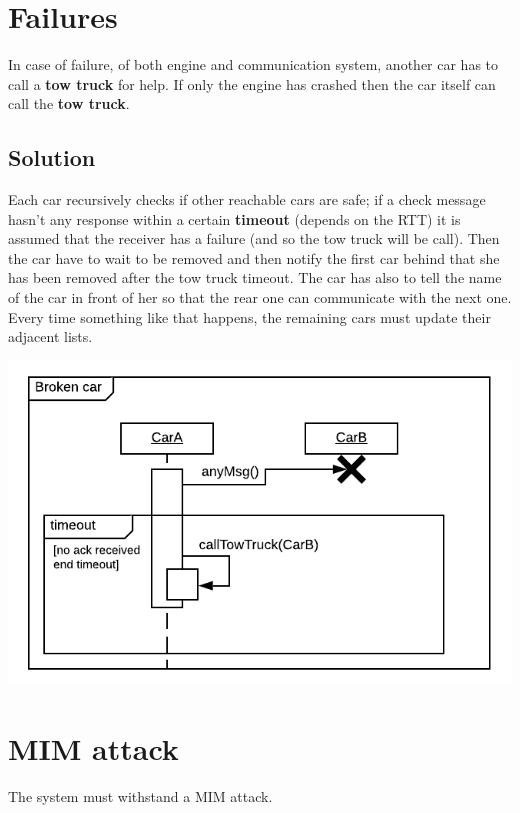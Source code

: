 \section{Failures}

In case of failure, of both engine and communication system,
 another car has to call a \textbf{tow truck} for help. If only the engine has crashed then the car
 itself can call the \textbf{tow truck}.

\subsection{Solution}

Each car recursively checks if other reachable cars are safe; if a check message
hasn't any response within a certain \textbf{timeout} (depends on the RTT) it is assumed 
that the receiver has a failure (and so the tow truck will be call). Then the car have to wait to be removed 
and then notify the first car behind that she has been removed after the tow truck timeout.
The car has also to tell the name of the car in front of her so that the rear one can communicate with the next one. \\
Every time something like that happens, the remaining cars must update their adjacent lists.

\begin{center}
    \includegraphics[scale=0.9]{assets/ds2019_4.png}
\end{center}


\section{MIM attack}

The system must withstand a MIM attack.


